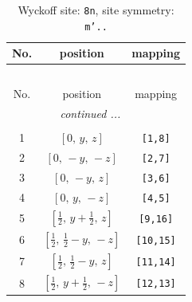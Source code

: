 \documentclass[fleqn,8pt]{jsarticle}
\begin{document}
\begin{longtable}{ccc}
\caption{Wyckoff site: {\tt 8n}, site symmetry: {\tt m'..}}
 \\
 \hline \hline
No. & position & mapping \\ \hline \endfirsthead

\multicolumn{2}{l}{\tablename\ \thetable{}} \\
 \hline \hline
No. & position & mapping \\ \hline \endhead

 \hline \hline
\multicolumn{2}{r}{\footnotesize\it continued ...} \\ \endfoot

 \hline \hline
\multicolumn{2}{r}{} \\ \endlastfoot

1 & $\left[ 0,\, y,\, z \right]$ & {\tt [1,8]} \\ \hline
2 & $\left[ 0,\, - y,\, - z \right]$ & {\tt [2,7]} \\ \hline
3 & $\left[ 0,\, - y,\, z \right]$ & {\tt [3,6]} \\ \hline
4 & $\left[ 0,\, y,\, - z \right]$ & {\tt [4,5]} \\ \hline
5 & $\left[ \frac{1}{2},\, y + \frac{1}{2},\, z \right]$ & {\tt [9,16]} \\ \hline
6 & $\left[ \frac{1}{2},\, \frac{1}{2} - y,\, - z \right]$ & {\tt [10,15]} \\ \hline
7 & $\left[ \frac{1}{2},\, \frac{1}{2} - y,\, z \right]$ & {\tt [11,14]} \\ \hline
8 & $\left[ \frac{1}{2},\, y + \frac{1}{2},\, - z \right]$ & {\tt [12,13]} \\
\end{longtable}
\renewcommand{\arraystretch}{1.2}
\end{document}
